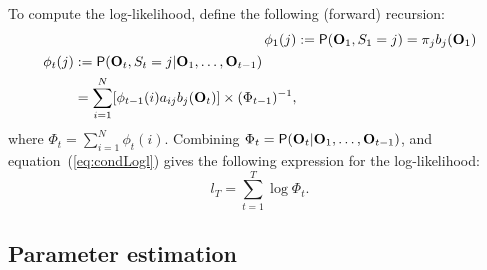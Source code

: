 \documentclass[article]{jss}
\newcommand{\vc}{\mathbf}
\begin{document}
To compute the log-likelihood, \cite{Lystig2002} define the following 
(forward) recursion:
\begin{align}
	\phi_{1}(j) &:= \Prob(\vc{O}_{1}, S_{1}=j) = \pi_{j} b_{j}(\vc{O}_{1}) 
	\label{eq:fwd1} \\
\begin{split}
	\phi_{t}(j) &:= \Prob(\vc{O}_{t}, S_{t}=j|\vc{O}_{1}, \ldots, 
\vc{O}_{t-1}) \\
	&= \sum_{i=1}^{N} [\phi_{t-1}(i)a_{ij}b_{j}(\vc{O}_{t})] \times 
(\Phi_{t-1})^{-1},
	\label{eq:fwdt} 
\end{split} 
\end{align}
where $\Phi_{t}=\sum_{i=1}^{N} \phi_{t}(i)$. Combining 
$\Phi_{t}=\Prob(\vc{O}_{t}|\vc{O}_{1}, \ldots, \vc{O}_{t-1})$, and 
equation~(\ref{eq:condLogl}) gives the following expression for the 
log-likelihood:
\begin{equation}
	l_{T} = \sum_{t=1}^{T} \log \Phi_{t}.
	\label{eq:logl}
\end{equation}


\subsection{Parameter estimation}
\end{document}
